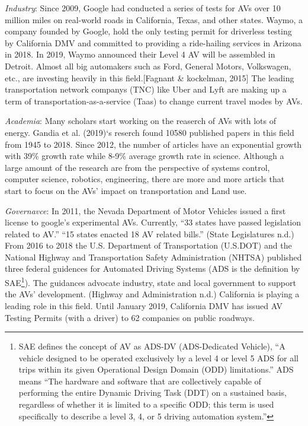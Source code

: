 \documentclass[12pt,]{article}
\let\rmarkdownfootnote\footnote%
\def\footnote{\protect\rmarkdownfootnote}
\begin{document}
\emph{Industry}: Since 2009, Google had conducted a series of tests for
AVs over 10 million miles on real-world roads in California, Texas, and
other states. Waymo, a company founded by Google, hold the only testing
permit for driverless testing by California DMV and committed to
providing a ride-hailing services in Arizona in 2018. In 2019, Waymo
announced their Level 4 AV will be assembled in Detroit. Almost all big
automakers such as Ford, General Motors, Volkswagen, etc., are investing
heavily in this field.{[}Fagnant \& kockelman, 2015{]} The leading
transportation network companys (TNC) like Uber and Lyft are making up a
term of transportation-as-a-service (Taas) to change current travel
modes by AVs.

\emph{Academia}: Many scholars start working on the reaserch of AVs with
lots of energy. Gandia et al. (2019)`s reserch found 10580 published
papers in this field from 1945 to 2018. Since 2012, the number of
articles have an exponential growth with 39\% growth rate while 8-9\%
average growth rate in science. Although a large amount of the research
are from the perspective of systems control, computer science, robotics,
engineering, there are more and more articls that start to focus on the
AVs' impact on transportation and Land use.

\emph{Governavce}: In 2011, the Nevada Department of Motor Vehicles
issued a first license to google's experimental AVs. Currently, ``33
states have passed legislation related to AV.'' ``15 states enacted 18
AV related bills.'' (State Legislatures n.d.) From 2016 to 2018 the U.S.
Department of Transportation (U.S.DOT) and the National Highway and
Transportation Safety Administration (NHTSA) published three federal
guidences for Automated Driving Systems (ADS is the definition by
SAE\footnote{SAE defines the concept of AV as ADS-DV (ADS-Dedicated
  Vehicle), ``A vehicle designed to be operated exclusively by a level 4
  or level 5 ADS for all trips within its given Operational Design
  Domain (ODD) limitations.'' ADS means ``The hardware and software that
  are collectively capable of performing the entire Dynamic Driving Task
  (DDT) on a sustained basis, regardless of whether it is limited to a
  specific ODD; this term is used specifically to describe a level 3, 4,
  or 5 driving automation system.''}). The guidances advocate industry,
state and local government to support the AVs' development. (Highway and
Administration n.d.) California is playing a leading role in this field.
Until January 2019, California DMV has issued AV Testing Permits (with a
driver) to 62 companies on public roadways.
\end{document}
